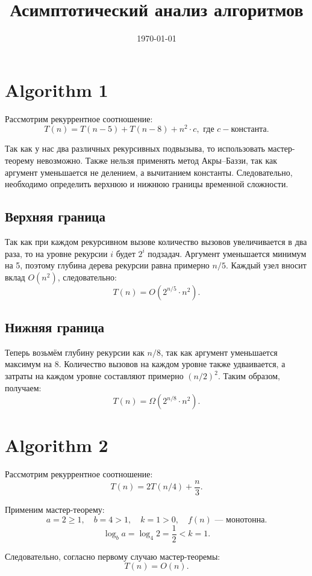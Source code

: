 \documentclass[a4paper,12pt]{article}
\title{Асимптотический анализ алгоритмов}
\date{\today}
\author{}
\begin{document}
\maketitle

\section*{Algorithm 1}

Рассмотрим рекуррентное соотношение:
\[
T(n) = T(n - 5) + T(n - 8) + n^2 \cdot c, \text{ где } c - \text{константа.}
\]

Так как у нас два различных рекурсивных подвызыва, то использовать мастер-теорему невозможно.  
Также нельзя применять метод Акры–Баззи, так как аргумент уменьшается не делением, а вычитанием константы.  
Следовательно, необходимо определить верхнюю и нижнюю границы временной сложности.

\subsection*{Верхняя граница}

Так как при каждом рекурсивном вызове количество вызовов увеличивается в два раза,  
то на уровне рекурсии \(i\) будет \(2^i\) подзадач.  
Аргумент уменьшается минимум на 5, поэтому глубина дерева рекурсии равна примерно \(n / 5\).  
Каждый узел вносит вклад \(O(n^2)\), следовательно:
\[
T(n) = O(2^{n/5} \cdot n^2).
\]

\subsection*{Нижняя граница}

Теперь возьмём глубину рекурсии как \(n / 8\), так как аргумент уменьшается максимум на 8.  
Количество вызовов на каждом уровне также удваивается,  
а затраты на каждом уровне составляют примерно \((n / 2)^2\).  
Таким образом, получаем:
\[
T(n) = \Omega(2^{n/8} \cdot n^2).
\]

\section*{Algorithm 2}

Рассмотрим рекуррентное соотношение:
\[
T(n) = 2T(n / 4) + \frac{n}{3}.
\]

Применим мастер-теорему:
\[
a = 2 \ge 1, \quad b = 4 > 1, \quad k = 1 > 0, \quad f(n) \text{ — монотонна.}
\]
\[
\log_b a = \log_4 2 = \frac{1}{2} < k = 1.
\]

Следовательно, согласно первому случаю мастер-теоремы:
\[
T(n) = O(n).
\]
\end{document}
